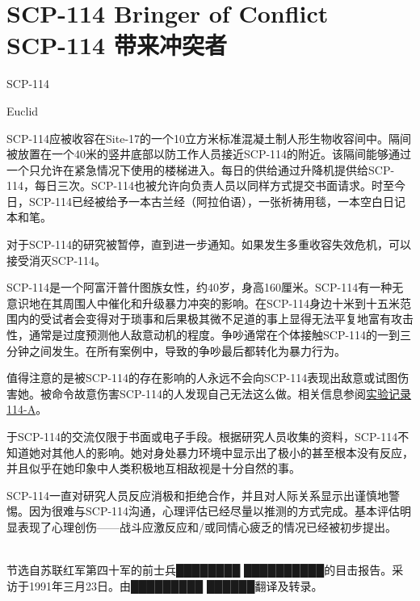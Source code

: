 \chapter[SCP-114 带来冲突者]{
    SCP-114 Bringer of Conflict\\
    SCP-114 带来冲突者
}

\label{chap:SCP-114}

SCP-114

Euclid

SCP-114应被收容在Site-17的一个10立方米标准混凝土制人形生物收容间中。隔间被放置在一个40米的竖井底部以防工作人员接近SCP-114的附近。该隔间能够通过一个只允许在紧急情况下使用的楼梯进入。每日的供给通过升降机提供给SCP-114，每日三次。SCP-114也被允许向负责人员以同样方式提交书面请求。时至今日，SCP-114已经被给予一本古兰经（阿拉伯语），一张祈祷用毯，一本空白日记本和笔。

对于SCP-114的研究被暂停，直到进一步通知。如果发生多重收容失效危机，可以接受消灭SCP-114。

SCP-114是一个阿富汗普什图族女性，约40岁，身高160厘米。SCP-114有一种无意识地在其周围人中催化和升级暴力冲突的影响。在SCP-114身边十米到十五米范围内的受试者会变得对于琐事和后果极其微不足道的事上显得无法平复地富有攻击性，通常是过度预测他人敌意动机的程度。争吵通常在个体接触SCP-114的一到三分钟之间发生。在所有案例中，导致的争吵最后都转化为暴力行为。

值得注意的是被SCP-114的存在影响的人永远不会向SCP-114表现出敌意或试图伤害她。被命令故意伤害SCP-114的人发现自己无法这么做。相关信息参阅\hyperref[chap:]{实验记录114-A}。

于SCP-114的交流仅限于书面或电子手段。根据研究人员收集的资料，SCP-114不知道她对其他人的影响。她对身处暴力环境中显示出了极小的甚至根本没有反应，并且似乎在她印象中人类积极地互相敌视是十分自然的事。

SCP-114一直对研究人员反应消极和拒绝合作，并且对人际关系显示出谨慎地警惕。因为很难与SCP-114沟通，心理评估已经尽量以推测的方式完成。基本评估明显表现了心理创伤——战斗应激反应和\slash 或同情心疲乏的情况已经被初步提出。

\\
节选自苏联红军第四十军的前士兵████████ ██████████的目击报告。采访于1991年三月23日。由█████████ ██████翻译及转录。

